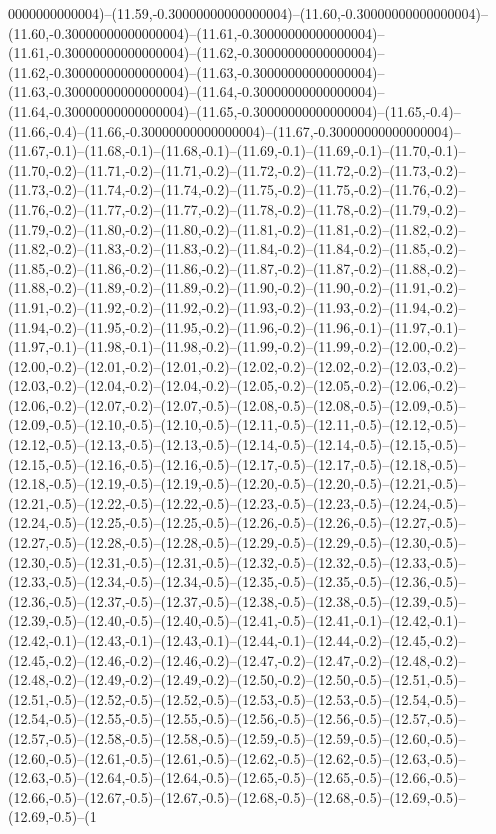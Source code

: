 0000000000004)--(11.59,-0.30000000000000004)--(11.60,-0.30000000000000004)--(11.60,-0.30000000000000004)--(11.61,-0.30000000000000004)--(11.61,-0.30000000000000004)--(11.62,-0.30000000000000004)--(11.62,-0.30000000000000004)--(11.63,-0.30000000000000004)--(11.63,-0.30000000000000004)--(11.64,-0.30000000000000004)--(11.64,-0.30000000000000004)--(11.65,-0.30000000000000004)--(11.65,-0.4)--(11.66,-0.4)--(11.66,-0.30000000000000004)--(11.67,-0.30000000000000004)--(11.67,-0.1)--(11.68,-0.1)--(11.68,-0.1)--(11.69,-0.1)--(11.69,-0.1)--(11.70,-0.1)--(11.70,-0.2)--(11.71,-0.2)--(11.71,-0.2)--(11.72,-0.2)--(11.72,-0.2)--(11.73,-0.2)--(11.73,-0.2)--(11.74,-0.2)--(11.74,-0.2)--(11.75,-0.2)--(11.75,-0.2)--(11.76,-0.2)--(11.76,-0.2)--(11.77,-0.2)--(11.77,-0.2)--(11.78,-0.2)--(11.78,-0.2)--(11.79,-0.2)--(11.79,-0.2)--(11.80,-0.2)--(11.80,-0.2)--(11.81,-0.2)--(11.81,-0.2)--(11.82,-0.2)--(11.82,-0.2)--(11.83,-0.2)--(11.83,-0.2)--(11.84,-0.2)--(11.84,-0.2)--(11.85,-0.2)--(11.85,-0.2)--(11.86,-0.2)--(11.86,-0.2)--(11.87,-0.2)--(11.87,-0.2)--(11.88,-0.2)--(11.88,-0.2)--(11.89,-0.2)--(11.89,-0.2)--(11.90,-0.2)--(11.90,-0.2)--(11.91,-0.2)--(11.91,-0.2)--(11.92,-0.2)--(11.92,-0.2)--(11.93,-0.2)--(11.93,-0.2)--(11.94,-0.2)--(11.94,-0.2)--(11.95,-0.2)--(11.95,-0.2)--(11.96,-0.2)--(11.96,-0.1)--(11.97,-0.1)--(11.97,-0.1)--(11.98,-0.1)--(11.98,-0.2)--(11.99,-0.2)--(11.99,-0.2)--(12.00,-0.2)--(12.00,-0.2)--(12.01,-0.2)--(12.01,-0.2)--(12.02,-0.2)--(12.02,-0.2)--(12.03,-0.2)--(12.03,-0.2)--(12.04,-0.2)--(12.04,-0.2)--(12.05,-0.2)--(12.05,-0.2)--(12.06,-0.2)--(12.06,-0.2)--(12.07,-0.2)--(12.07,-0.5)--(12.08,-0.5)--(12.08,-0.5)--(12.09,-0.5)--(12.09,-0.5)--(12.10,-0.5)--(12.10,-0.5)--(12.11,-0.5)--(12.11,-0.5)--(12.12,-0.5)--(12.12,-0.5)--(12.13,-0.5)--(12.13,-0.5)--(12.14,-0.5)--(12.14,-0.5)--(12.15,-0.5)--(12.15,-0.5)--(12.16,-0.5)--(12.16,-0.5)--(12.17,-0.5)--(12.17,-0.5)--(12.18,-0.5)--(12.18,-0.5)--(12.19,-0.5)--(12.19,-0.5)--(12.20,-0.5)--(12.20,-0.5)--(12.21,-0.5)--(12.21,-0.5)--(12.22,-0.5)--(12.22,-0.5)--(12.23,-0.5)--(12.23,-0.5)--(12.24,-0.5)--(12.24,-0.5)--(12.25,-0.5)--(12.25,-0.5)--(12.26,-0.5)--(12.26,-0.5)--(12.27,-0.5)--(12.27,-0.5)--(12.28,-0.5)--(12.28,-0.5)--(12.29,-0.5)--(12.29,-0.5)--(12.30,-0.5)--(12.30,-0.5)--(12.31,-0.5)--(12.31,-0.5)--(12.32,-0.5)--(12.32,-0.5)--(12.33,-0.5)--(12.33,-0.5)--(12.34,-0.5)--(12.34,-0.5)--(12.35,-0.5)--(12.35,-0.5)--(12.36,-0.5)--(12.36,-0.5)--(12.37,-0.5)--(12.37,-0.5)--(12.38,-0.5)--(12.38,-0.5)--(12.39,-0.5)--(12.39,-0.5)--(12.40,-0.5)--(12.40,-0.5)--(12.41,-0.5)--(12.41,-0.1)--(12.42,-0.1)--(12.42,-0.1)--(12.43,-0.1)--(12.43,-0.1)--(12.44,-0.1)--(12.44,-0.2)--(12.45,-0.2)--(12.45,-0.2)--(12.46,-0.2)--(12.46,-0.2)--(12.47,-0.2)--(12.47,-0.2)--(12.48,-0.2)--(12.48,-0.2)--(12.49,-0.2)--(12.49,-0.2)--(12.50,-0.2)--(12.50,-0.5)--(12.51,-0.5)--(12.51,-0.5)--(12.52,-0.5)--(12.52,-0.5)--(12.53,-0.5)--(12.53,-0.5)--(12.54,-0.5)--(12.54,-0.5)--(12.55,-0.5)--(12.55,-0.5)--(12.56,-0.5)--(12.56,-0.5)--(12.57,-0.5)--(12.57,-0.5)--(12.58,-0.5)--(12.58,-0.5)--(12.59,-0.5)--(12.59,-0.5)--(12.60,-0.5)--(12.60,-0.5)--(12.61,-0.5)--(12.61,-0.5)--(12.62,-0.5)--(12.62,-0.5)--(12.63,-0.5)--(12.63,-0.5)--(12.64,-0.5)--(12.64,-0.5)--(12.65,-0.5)--(12.65,-0.5)--(12.66,-0.5)--(12.66,-0.5)--(12.67,-0.5)--(12.67,-0.5)--(12.68,-0.5)--(12.68,-0.5)--(12.69,-0.5)--(12.69,-0.5)--(1